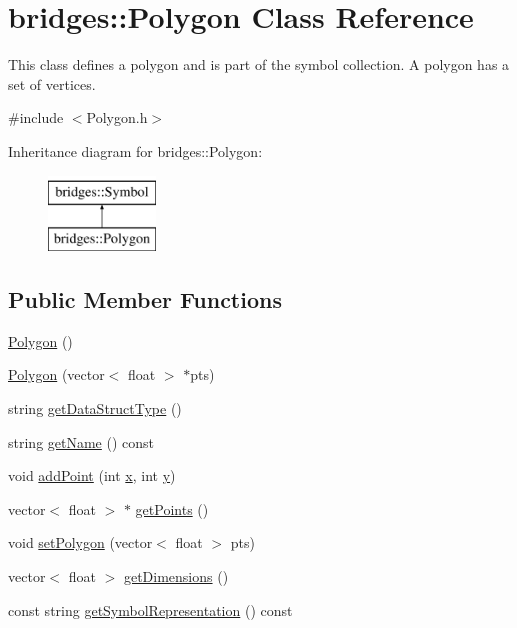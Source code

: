 \hypertarget{classbridges_1_1_polygon}{}\section{bridges\+::Polygon Class Reference}
\label{classbridges_1_1_polygon}


This class defines a polygon and is part of the symbol collection. A polygon has a set of vertices.  




{\ttfamily \#include $<$Polygon.\+h$>$}

Inheritance diagram for bridges\+::Polygon\+:\begin{figure}[H]
\begin{center}
\leavevmode
\includegraphics[height=2.000000cm]{classbridges_1_1_polygon}
\end{center}
\end{figure}
\subsection*{Public Member Functions}
\begin{DoxyCompactItemize}
\item 
\mbox{\hyperlink{classbridges_1_1_polygon_ade0fbaaa5a1b638ec6faec52ee6950f3}{Polygon}} ()
\item 
\mbox{\hyperlink{classbridges_1_1_polygon_acd99b72ad6c6d0ecc9cdc7a19b5bbcaf}{Polygon}} (vector$<$ float $>$ $\ast$pts)
\item 
string \mbox{\hyperlink{classbridges_1_1_polygon_a6b6d16de65c74f1e2e4e8f0ff4056451}{get\+Data\+Struct\+Type}} ()
\item 
string \mbox{\hyperlink{classbridges_1_1_polygon_af376b1e7ab19ae90e7de9ba1f717753b}{get\+Name}} () const
\item 
void \mbox{\hyperlink{classbridges_1_1_polygon_ad38f9d5431e4a2dc9f5ed633e118c95c}{add\+Point}} (int \mbox{\hyperlink{namespacebridges_acfb0a4f7877d8f63de3e6862004c50eda9dd4e461268c8034f5c8564e155c67a6}{x}}, int \mbox{\hyperlink{namespacebridges_acfb0a4f7877d8f63de3e6862004c50eda415290769594460e2e485922904f345d}{y}})
\item 
vector$<$ float $>$ $\ast$ \mbox{\hyperlink{classbridges_1_1_polygon_aa4006759697d4428074747686cf231f9}{get\+Points}} ()
\item 
void \mbox{\hyperlink{classbridges_1_1_polygon_a43ffa2f8767318c9c831dad9ed030679}{set\+Polygon}} (vector$<$ float $>$ pts)
\item 
vector$<$ float $>$ \mbox{\hyperlink{classbridges_1_1_polygon_a6ad07473cb57633eca62a3f6832ea08c}{get\+Dimensions}} ()
\item 
const string \mbox{\hyperlink{classbridges_1_1_polygon_a5c3e3bbeda23db712088278a3c82a0a6}{get\+Symbol\+Representation}} () const
\end{DoxyCompactItemize}
